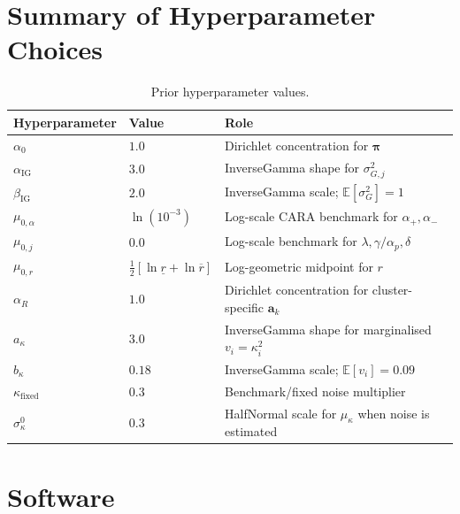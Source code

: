 \documentclass[12pt, a4paper]{article}
\newcommand{\E}{\mathbb{E}}
\newcommand{\bpi}{\bm{\pi}}
\newcommand{\ba}{\mathbf{a}}
\newcommand{\ksi}{\kappa}
\begin{document}
\section{Summary of Hyperparameter Choices}
\label{sec:hyperparams}

\begin{table}[h!]
  \centering
  \caption{Prior hyperparameter values.}
  \label{tab:hyperparams}
  \begin{tabular}{lll}
    \toprule
    Hyperparameter & Value & Role \\
    \midrule
    $\alpha_0$            & $1.0$  & Dirichlet concentration for $\bpi$ \\
    $\alpha_{\mathrm{IG}}$& $3.0$  & InverseGamma shape for $\sigma_{G,j}^2$ \\
    $\beta_{\mathrm{IG}}$ & $2.0$  & InverseGamma scale; $\E[\sigma_G^2]=1$ \\
    $\mu_{0,\alpha}$      & $\ln(10^{-3})$ & Log-scale CARA benchmark for $\alpha_+,\alpha_-$ \\
    $\mu_{0,j}$           & $0.0$  & Log-scale benchmark for $\lambda,\gamma/\alpha_p,\delta$ \\
    $\mu_{0,r}$           & $\frac{1}{2}[\ln\underline{r}+\ln\overline{r}]$
                                   & Log-geometric midpoint for $r$ \\
    $\alpha_R$            & $1.0$  & Dirichlet concentration for cluster-specific $\ba_k$ \\
    $a_\ksi$              & $3.0$  & InverseGamma shape for marginalised $v_i=\ksi_i^2$ \\
    $b_\ksi$              & $0.18$ & InverseGamma scale; $\E[v_i]=0.09$ \\
    $\ksi_{\mathrm{fixed}}$& $0.3$ & Benchmark/fixed noise multiplier \\
    $\sigma_\ksi^0$       & $0.3$  & HalfNormal scale for $\mu_\ksi$ when noise is estimated \\
    \bottomrule
  \end{tabular}
\end{table}

\section{Software}
\label{sec:software}
\end{document}

